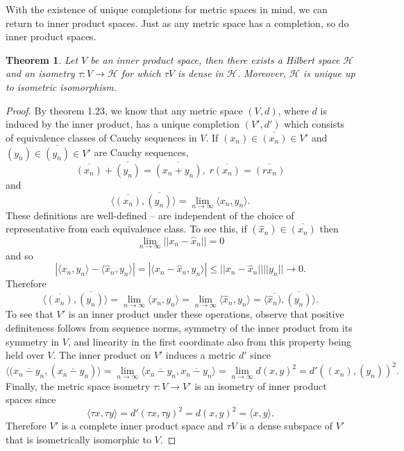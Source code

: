 \documentclass{article}
\newtheorem{thm}{Theorem}[section]
\theoremstyle{definition}
\theoremstyle{remark}
\numberwithin{equation}{section}
\begin{document}
With the existence of unique completions for metric spaces in mind, we can return to inner product spaces. Just as any metric space has a completion, so do inner product spaces. 

\begin{thm}
Let $V$ be an inner product space, then there exists a Hilbert space $\mathcal{H}$ and an isometry $\tau : V \rightarrow \mathcal{H}$ for which $\tau V$ is dense in $\mathcal{H}$. Moreover, $\mathcal{H}$ is unique up to isometric isomorphism. 
\end{thm}

\begin{proof}
By theorem 1.23, we know that any metric space $(V,d)$, where $d$ is induced by the inner product, has a unique completion $(V', d')$ which consists of equivalence classes of Cauchy sequences in $V$. If $(x_n) \in \overline{(x_n)} \in V'$ and $(y_n) \in \overline{(y_n)} \in V'$ are Cauchy sequences, 
$$\overline{(x_n)} + \overline{(y_n)} = \overline{(x_n +y_n)}, \; r \overline{(x_n)} = \overline{(rx_n)} $$
and 
$$\langle \overline{(x_n)}, \overline{(y_n)} \rangle = \lim _{n \rightarrow \infty} \langle x_n, y_n \rangle . $$
These definitions are well-defined -- are independent of the choice of representative from each equivalence class. To see this, if $(\hat{x}_n ) \in \overline{(x_n)}$ then 
$$\lim _{n \rightarrow \infty} || x_n - \hat{x}_n || = 0 $$
and so 
$$|\langle x_n , y_n \rangle - \langle \hat{x} _n , y_n \rangle | = | \langle x_n - \hat{x} _n , y_n \rangle | \leq || x_n - \hat{x}_n || || y_n || \rightarrow 0.  $$
Therefore 
$$\langle \overline{(x_n)}, \overline{(y_n)} \rangle = \lim _{n \rightarrow \infty} \langle x_n ,y_n \rangle = \lim _{n \rightarrow \infty} \langle \hat{x}_n , y_n \rangle = \langle \overline{\hat{x}_n)}, \overline{(y_n)} \rangle.  $$
To see that $V'$ is an inner product under these operations, observe that positive definiteness follows from sequence norms, symmetry of the inner product from its symmetry in $V$, and linearity in the first coordinate also from this property being held over $V$. The inner product on $V'$ induces a metric $d'$ since 
$$\langle (\overline{x_n - y_n}, (\overline{x_n - y_n})\rangle = \lim _{n \rightarrow \infty} \langle \overline{x_n - y_n}, \overline{x_n - y_n} \rangle = \lim _{n \rightarrow \infty} d(x,y)^2 = d'((x_n), (y_n)) ^2. $$
Finally, the metric space isometry $\tau: V \rightarrow V'$ is an isometry of inner product spaces since 
$$\langle \tau x, \tau y \rangle = d'(\tau x, \tau y )^2 = d(x,y)^2 = \langle x, y \rangle.  $$
Therefore $V'$ is a complete inner product space and $\tau V$ is a dense subspace of $V'$ that is isometrically isomorphic to $V$. 

\end{proof}
\end{document}
